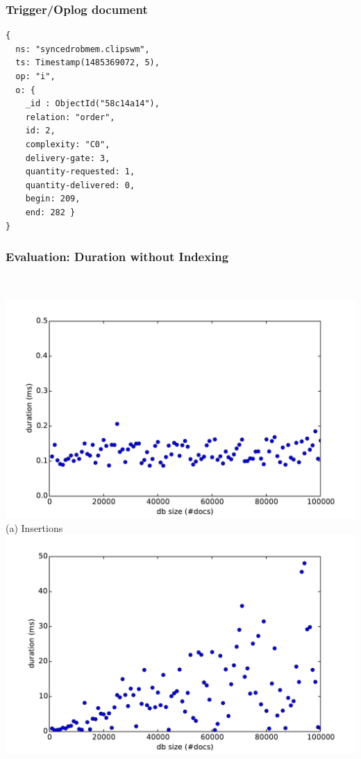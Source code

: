 \begin{frame}[fragile]
  \frametitle{Trigger/Oplog document}
\begin{lstlisting}[style=SmallJSON,
  label=lst:Oplog,
  framexleftmargin=2pt, xleftmargin=0pt,
 morekeywords={}, numbers=none]
{
  ns: "syncedrobmem.clipswm",
  ts: Timestamp(1485369072, 5),
  op: "i",
  o: {
    _id : ObjectId("58c14a14"),
    relation: "order",
    id: 2,
    complexity: "C0",
    delivery-gate: 3,
    quantity-requested: 1,
    quantity-delivered: 0,
    begin: 209,
    end: 282 }
}
\end{lstlisting}
\end{frame}


\begin{frame}
  \frametitle{Evaluation: Duration without Indexing}
  \centering
  \begin{columns}
    \begin{column}{0.55\textwidth}
  \centering
    \\\vspace{-0.08cm}
    \includegraphics[width=\textwidth]{../thesis/plots/insert-durations}\\
    (a) Insertions
    \\\vspace{-0.08cm}
    \includegraphics[width=\textwidth]{../thesis/plots/update-durations}\\

\end{column}
\end{columns}
\end{frame}
